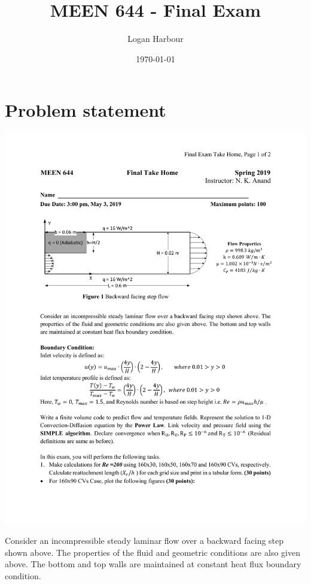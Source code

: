 \documentclass{article}
\newcommand{\pageTitle}{MEEN 644 - Final Exam}
\newcommand{\pageAuthor}{Logan Harbour}
\begin{document}
\title{\LARGE \textbf{\pageTitle} \vspace{-0.3cm}}
\author{\large \pageAuthor}
\date{\vspace{-0.6cm} \large \today \vspace{-0.4cm}}

\maketitle

\section{Problem statement}

\begin{center}
	\includegraphics[trim={2.8cm 16.8cm 2.5cm 6cm},clip,page=1,scale=0.8]{../doc/final.pdf}
\end{center}

Consider an incompressible steady laminar flow over a backward facing step shown above. The properties of the fluid and geometric conditions are also given above. The bottom and top walls are maintained at constant heat flux boundary condition.
\end{document}
